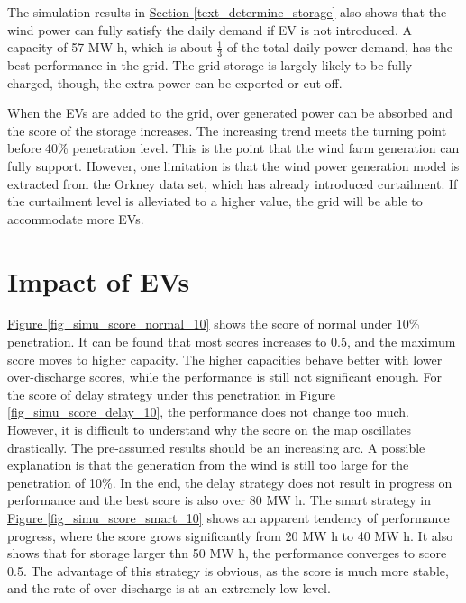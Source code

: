 \documentclass[12pt,a4paper]{report}
\begin{document}
        The simulation results in \hyperref[text_determine_storage]{Section \ref*{text_determine_storage}} also shows that the wind power can fully satisfy the daily demand if EV is not introduced. A capacity of 57 MW h, which is about $\frac{1}{3}$ of the total daily power demand, has the best performance in the grid.
        The grid storage is largely likely to be fully charged, though, the extra power can be exported or cut off. 
        
        When the EVs are added to the grid, over generated power can be absorbed and the score of the storage increases. The increasing trend meets the turning point before 40\% penetration level. This is the point that the wind farm generation can fully support. However, one limitation is that the wind power generation model is extracted from the Orkney data set, which has already introduced curtailment. If the curtailment level is alleviated to a higher value, the grid will be able to accommodate more EVs.

        \section{Impact of EVs}

        \hyperref[fig_simu_score_normal_10]{Figure \ref*{fig_simu_score_normal_10}} shows the score of normal under 10\% penetration. It can be found that most scores increases to 0.5, and the maximum score moves to higher capacity. The higher capacities behave better with lower over-discharge scores, while the performance is still not significant enough.
        For the score of delay strategy under this penetration in \hyperref[fig_simu_score_delay_10]{Figure \ref*{fig_simu_score_delay_10}}, the performance does not change too much. However, it is difficult to understand why the score on the map oscillates drastically. The pre-assumed results should be an increasing arc. A possible explanation is that the generation from the wind is still too large for the penetration of 10\%. In the end, the delay strategy does not result in progress on performance and the best score is also over 80 MW h.
        The smart strategy in \hyperref[fig_simu_score_smart_10]{Figure \ref*{fig_simu_score_smart_10}} shows an apparent tendency of performance progress, where the score grows significantly from 20 MW h to 40 MW h. It also shows that for storage larger thn 50 MW h, the performance converges to score 0.5. The advantage of this strategy is obvious, as the score is much more stable, and the rate of over-discharge is at an extremely low level.
\end{document}
